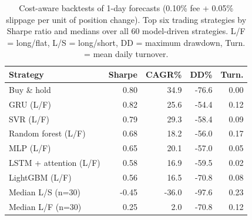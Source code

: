 \begin{table}[t]
\centering
\caption{Cost-aware backtests of 1-day forecasts (0.10\% fee + 0.05\% slippage per unit of position change). Top six trading strategies by Sharpe ratio and medians over all 60 model-driven strategies. L/F = long/flat, L/S = long/short, DD = maximum drawdown, Turn. = mean daily turnover.}
\label{tab:backtest}
\footnotesize
\setlength{\tabcolsep}{3.5pt}
\begin{tabular}{lrrrr}
\toprule
Strategy & Sharpe & CAGR\% & DD\% & Turn. \\
\midrule
Buy \& hold & 0.80 & 34.9 & -76.6 & 0.00 \\
\midrule
GRU (L/F) & 0.82 & 25.6 & -54.4 & 0.12 \\
SVR (L/F) & 0.79 & 29.3 & -58.4 & 0.09 \\
Random forest (L/F) & 0.68 & 18.2 & -56.0 & 0.17 \\
MLP (L/F) & 0.65 & 20.1 & -57.0 & 0.05 \\
LSTM + attention (L/F) & 0.58 & 16.9 & -59.5 & 0.02 \\
LightGBM (L/F) & 0.56 & 16.5 & -70.8 & 0.08 \\
\midrule
Median L/S (n=30) & -0.45 & -36.0 & -97.6 & 0.23 \\
Median L/F (n=30) & 0.25 & 2.0 & -70.8 & 0.12 \\
\bottomrule
\end{tabular}
\end{table}
